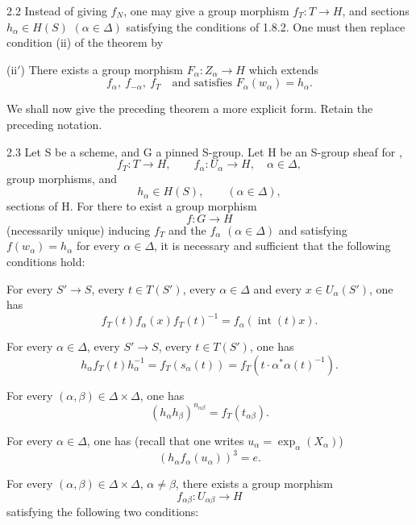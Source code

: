 \begin{remark}{2.2}\label{XXIII.2.2}
Instead of giving $f_N$, one may give a group morphism $f_T:T\to H$, and sections $h_\alpha\in H(S)$ $(\alpha\in\Delta)$ satisfying the conditions of 1.8.2. One must then replace condition (ii) of the theorem by

(ii$'$) There exists a group morphism $F_\alpha:Z_\alpha\to H$ which extends
\[
f_\alpha,\ f_{-\alpha},\ f_T\quad\text{and satisfies }F_\alpha(w_\alpha)=h_\alpha.
\]
\end{remark}

We shall now give the preceding theorem a more explicit form. Retain the preceding notation.
\begin{theorem}{2.3}\label{XXIII.2.3}
Let S be a scheme, and G a pinned S-group. Let H be an S-group sheaf for \fppf,
\[
f_T:T\to H,\qquad f_\alpha:U_\alpha\to H,\quad\alpha\in\Delta,
\]
group morphisms, and
\[
h_\alpha\in H(S),\qquad(\alpha\in\Delta),
\]
sections of H. For there to exist a group morphism
\[
f:G\to H
\]
(necessarily unique) inducing $f_T$ and the $f_\alpha$ $(\alpha\in\Delta)$ and satisfying $f(w_\alpha)=h_\alpha$ for every $\alpha\in\Delta$, it is necessary and sufficient that the following conditions hold:
\begin{enumeratei}
\item For every $S'\to S$, every $t\in T(S')$, every $\alpha\in\Delta$ and every $x\in U_\alpha(S')$, one has
\begin{equation}\tag{1}
f_T(t)f_\alpha(x)f_T(t)^{-1}=f_\alpha(\operatorname{int}(t)x).
\end{equation}
\item For every $\alpha\in\Delta$, every $S'\to S$, every $t\in T(S')$, one has
\begin{equation}\tag{2}
h_\alpha f_T(t)h_\alpha^{-1}=f_T(s_\alpha(t))=f_T(t\cdot\alpha^*\alpha(t)^{-1}).
\end{equation}
\item For every $(\alpha,\beta)\in\Delta\times\Delta$, one has
\begin{equation}\tag{3}
(h_\alpha h_\beta)^{n_{\alpha\beta}}=f_T(t_{\alpha\beta}).
\end{equation}
\item For every $\alpha\in\Delta$, one has (recall that one writes $u_\alpha=\exp_\alpha(X_\alpha)$)
\begin{equation}\tag{4}
(h_\alpha f_\alpha(u_\alpha))^3=e.
\end{equation}
\item For every $(\alpha,\beta)\in\Delta\times\Delta$, $\alpha\ne\beta$, there exists a group morphism
\[
f_{\alpha\beta}:U_{\alpha\beta}\to H
\]
satisfying the following two conditions:


\end{enumeratei}
\end{theorem}
